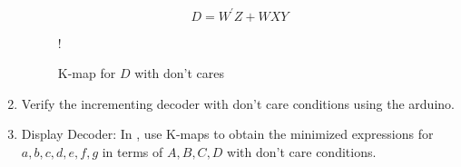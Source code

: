 \begin{enumerate}[label=\arabic*.,ref=\theenumi]
\begin{equation}
D  = {W}^{\prime}{Z} + {W}{X}{Y}
\end{equation}
\begin{figure}[H]
	\centering
\resizebox {0.5\columnwidth} {!} {

}
\caption{K-map for $D$ with don't cares}
\label{fig:kmap_D_x}
\end{figure}
%
\item 
	Verify the incrementing decoder with don't care conditions using the arduino.
\item {Display Decoder:}
In ,
use K-maps to obtain the minimized expressions for $a,b,c,d,e,f,g$ in terms of $A,B,C,D$ with  don't care conditions.
\end{enumerate}





